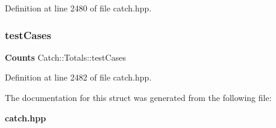Definition at line 2480 of file catch.\+hpp.

\mbox{\label{struct_catch_1_1_totals_adb195fe477aedee2ecea88c888f16506}} 
\subsubsection{testCases}
{\footnotesize\ttfamily \textbf{ Counts} Catch\+::\+Totals\+::test\+Cases}



Definition at line 2482 of file catch.\+hpp.



The documentation for this struct was generated from the following file\+:\begin{DoxyCompactItemize}
\item 
\textbf{ catch.\+hpp}\end{DoxyCompactItemize}
